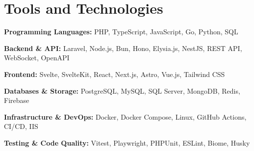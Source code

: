 \section{Tools and Technologies}

\begin{onecolentry}
	\textbf{Programming Languages:} PHP, TypeScript, JavaScript, Go, Python, SQL
\end{onecolentry}

\vspace{0.1cm}


\begin{onecolentry}
	\textbf{Backend \& API:} Laravel, Node.js, Bun, Hono, Elysia.js, NestJS, REST API, WebSocket, OpenAPI
\end{onecolentry}

\vspace{0.1cm}


\begin{onecolentry}
	\textbf{Frontend:} Svelte, SvelteKit, React, Next.js, Astro, Vue.js, Tailwind CSS
\end{onecolentry}

\vspace{0.1cm}


\begin{onecolentry}
	\textbf{Databases \& Storage:} PostgreSQL, MySQL, SQL Server, MongoDB, Redis, Firebase
\end{onecolentry}

\vspace{0.1cm}


\begin{onecolentry}
	\textbf{Infrastructure \& DevOps:} Docker, Docker Compose, Linux, GitHub Actions, CI/CD, IIS
\end{onecolentry}

\vspace{0.1cm}


\begin{onecolentry}
	\textbf{Testing \& Code Quality:} Vitest, Playwright, PHPUnit, ESLint, Biome, Husky
\end{onecolentry}
